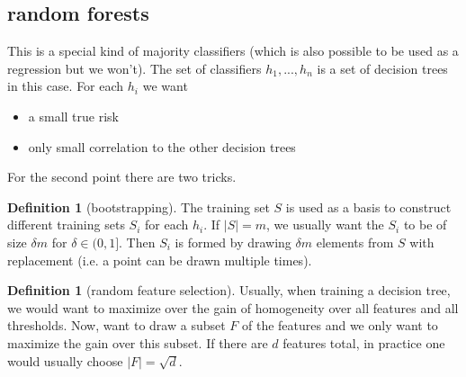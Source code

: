 \documentclass[a4paper, 12pt]{article}
\theoremstyle{plain}
\theoremstyle{definition}
\newtheorem{definition}[theorem]{Definition} %
\theoremstyle{lemma}
\theoremstyle{remark}
\theoremstyle{example}
\begin{document}
	\subsection{random forests}
	This is a special kind of majority classifiers (which is also possible to be used as a regression but we won't). The set of classifiers $h_1,...,h_n$ is a set of decision trees in this case. For each $h_i$ we want \begin{itemize}
		\item a small true risk
		\item only small correlation to the other decision trees
	\end{itemize}
	For the second point there are two tricks. \begin{definition}[bootstrapping]
		The training set $S$ is used as a basis to construct different training sets $S_i$ for each $h_i$. If $\left|S\right|=m$, we usually want the $S_i$ to be of size $\delta m$ for $\delta \in (0,1]$. Then $S_i$ is formed by drawing $\delta m$ elements from $S$ with replacement (i.e. a point can be drawn multiple times). 
	\end{definition}
	\begin{definition}[random feature selection]
		Usually, when training a decision tree, we would want to maximize over the gain of homogeneity over all features and all thresholds. Now, want to draw a subset $F$ of the features and we only want to maximize the gain over this subset. If there are $d$ features total, in practice one would usually choose $\left|F\right| = \sqrt{d}$.
	\end{definition}
\end{document}
